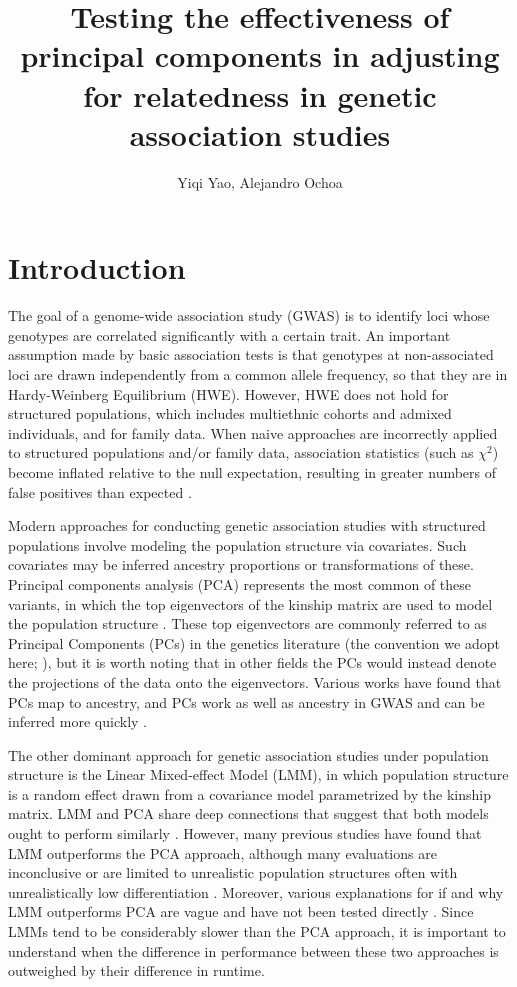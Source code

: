 \documentclass[12pt]{article}
\title{Testing the effectiveness of principal components in adjusting for relatedness in genetic association studies}
\author{Yiqi Yao, Alejandro Ochoa}
\begin{document}
\maketitle
	
\section{Introduction} 

The goal of a genome-wide association study (GWAS) is to identify loci whose genotypes are correlated significantly with a certain trait.
An important assumption made by basic association tests is that genotypes at non-associated loci are drawn independently from a common allele frequency, so that they are in Hardy-Weinberg Equilibrium (HWE).
However, HWE does not hold for structured populations, which includes multiethnic cohorts and admixed individuals, and for family data.
When naive approaches are incorrectly applied to structured populations and/or family data, association statistics (such as $\chi^2$) become inflated relative to the null expectation, resulting in greater numbers of false positives than expected \citep{devlin_genomic_1999, voight_confounding_2005, astle_population_2009}.

Modern approaches for conducting genetic association studies with structured populations involve modeling the population structure via covariates.
Such covariates may be inferred ancestry proportions \citep{pritchard_association_2000} or transformations of these.
Principal components analysis (PCA) represents the most common of these variants, in which the top eigenvectors of the kinship matrix are used to model the population structure \citep{price_principal_2006}.
These top eigenvectors are commonly referred to as Principal Components (PCs) in the genetics literature (the convention we adopt here; \cite{patterson_population_2006}), but it is worth noting that in other fields the PCs would instead denote the projections of the data onto the eigenvectors.
Various works have found that PCs map to ancestry, and PCs work as well as ancestry in GWAS and can be inferred more quickly \citep{patterson_population_2006}.

The other dominant approach for genetic association studies under population structure is the Linear Mixed-effect Model (LMM), in which population structure is a random effect drawn from a covariance model parametrized by the kinship matrix.
LMM and PCA share deep connections that suggest that both models ought to perform similarly \citep{hoffman_correcting_2013}.
However, many previous studies have found that LMM outperforms the PCA approach, although many evaluations are inconclusive or are limited to unrealistic population structures often with unrealistically low differentiation \citep{astle_population_2009, kang_variance_2010, price_new_2010, wang_analytical_2013}.
Moreover, various explanations for if and why LMM outperforms PCA are vague and have not been tested directly \citep{price_new_2010, sul_mixed_2013, price_response_2013}.
Since LMMs tend to be considerably slower than the PCA approach, it is important to understand when the difference in performance between these two approaches is outweighed by their difference in runtime.
\end{document}
